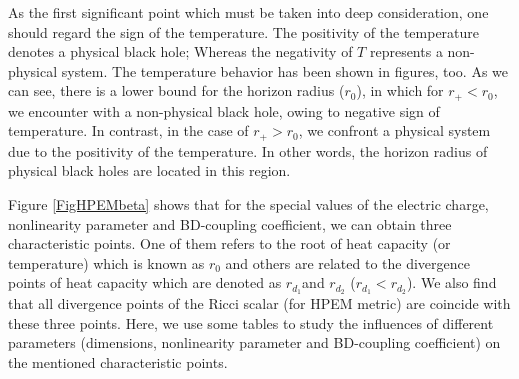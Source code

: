 \documentclass[aps,onecolumn ]{revtex4}
\begin{document}
As the first significant point which must be taken into deep
consideration, one should regard the sign of the temperature. The
positivity of the temperature denotes a physical black hole;
Whereas the negativity of $T$ represents a non-physical system.
The temperature behavior has been shown in figures, too. As we can
see, there is a lower bound for the horizon radius ($r_{0}$), in
which for $r_{+}< r_{0}$, we encounter with a non-physical black
hole, owing to negative sign of temperature. In contrast, in the
case of $r_{+}> r_{0}$, we confront a physical system due to the
positivity of the temperature. In other words, the horizon radius
of physical black holes are located in this region.

Figure \ref{FigHPEMbeta} shows that for the special values of the
electric charge, nonlinearity parameter and BD-coupling
coefficient, we can obtain three characteristic points. One of
them refers to the root of heat capacity (or temperature) which is
known as $r_{0}$ and others are related to the divergence points
of heat capacity which are denoted as $r_{d_{1}}$and $r_{d_{2}}$
($r_{d_{1}} < r_{d_{2}}$). We also find that all divergence points
of the Ricci scalar (for HPEM metric) are coincide with these
three points. Here, we use some tables to study the influences of
different parameters (dimensions, nonlinearity parameter and
BD-coupling coefficient) on the mentioned characteristic points.
\end{document}

